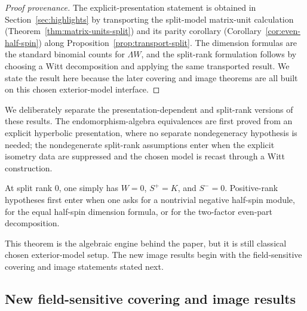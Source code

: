 \documentclass{birkjour}
\theoremstyle{plain}
\theoremstyle{definition}
\theoremstyle{remark}
\newcommand{\wedgeW}{\Lambda W}
\begin{document}
\begin{proof}[Proof provenance]
The explicit-presentation statement is obtained in
Section~{}\ref{sec:highlights} by transporting the split-model matrix-unit
calculation (Theorem~{}\ref{thm:matrix-units-split}) and its parity corollary
(Corollary~{}\ref{cor:even-half-spin}) along
Proposition~{}\ref{prop:transport-split}. The dimension formulas are the standard
binomial counts for $\wedgeW$, and the split-rank formulation follows by
choosing a Witt decomposition and applying the same transported result. We
state the result here because the later covering and image theorems are all
built on this chosen exterior-model interface.
\end{proof}

We deliberately separate the presentation-dependent and split-rank
versions of these results. The endomorphism-algebra equivalences are
first proved from an explicit hyperbolic presentation, where no separate
nondegeneracy hypothesis is needed; the nondegenerate split-rank assumptions
enter when the explicit isometry data are suppressed and the chosen model is
recast through a Witt construction.

At split rank $0$, one simply has $W=0$, $S^+=K$, and $S^-=0$. Positive-rank
hypotheses first enter when one asks for a nontrivial negative half-spin module,
for the equal half-spin dimension formula, or for the two-factor even-part
decomposition.

This theorem is the algebraic engine behind the paper, but it is still
classical chosen exterior-model setup. The new image results begin with the
field-sensitive covering and image statements stated next.

\subsection*{New field-sensitive covering and image results}
\end{document}
